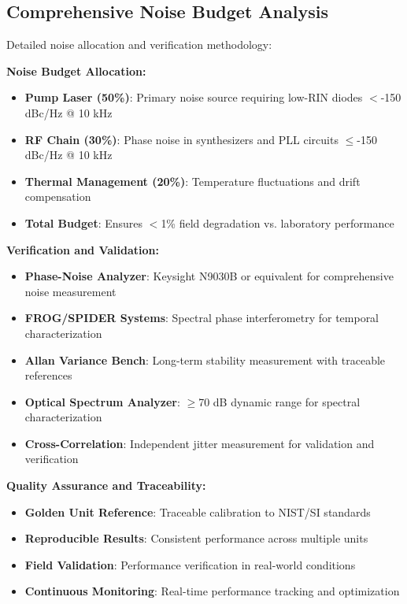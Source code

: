 \documentclass[11pt,a4paper]{article}
\begin{document}
\subsection{Comprehensive Noise Budget Analysis}
Detailed noise allocation and verification methodology:

\textbf{Noise Budget Allocation:}
\begin{itemize}
\item \textbf{Pump Laser (50\%)}: Primary noise source requiring low-RIN diodes $<$-150 dBc/Hz @ 10 kHz
\item \textbf{RF Chain (30\%)}: Phase noise in synthesizers and PLL circuits $\leq$-150 dBc/Hz @ 10 kHz
\item \textbf{Thermal Management (20\%)}: Temperature fluctuations and drift compensation
\item \textbf{Total Budget}: Ensures $<$1\% field degradation vs. laboratory performance
\end{itemize}

\textbf{Verification and Validation:}
\begin{itemize}
\item \textbf{Phase-Noise Analyzer}: Keysight N9030B or equivalent for comprehensive noise measurement
\item \textbf{FROG/SPIDER Systems}: Spectral phase interferometry for temporal characterization
\item \textbf{Allan Variance Bench}: Long-term stability measurement with traceable references
\item \textbf{Optical Spectrum Analyzer}: $\geq$70 dB dynamic range for spectral characterization
\item \textbf{Cross-Correlation}: Independent jitter measurement for validation and verification
\end{itemize}

\textbf{Quality Assurance and Traceability:}
\begin{itemize}
\item \textbf{Golden Unit Reference}: Traceable calibration to NIST/SI standards
\item \textbf{Reproducible Results}: Consistent performance across multiple units
\item \textbf{Field Validation}: Performance verification in real-world conditions
\item \textbf{Continuous Monitoring}: Real-time performance tracking and optimization
\end{itemize}
\end{document}

